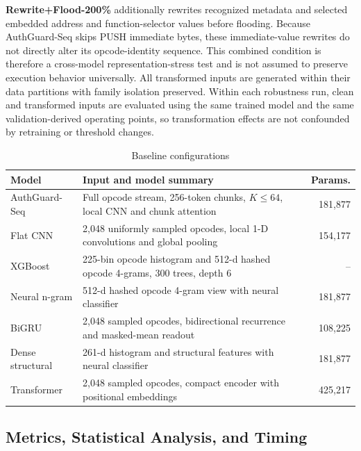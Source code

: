 \documentclass[conference]{IEEEtran}
\begin{document}
\textbf{Rewrite+Flood-200\%} additionally rewrites recognized metadata and selected embedded address and function-selector values before flooding. Because AuthGuard-Seq skips PUSH immediate bytes, these immediate-value rewrites do not directly alter its opcode-identity sequence. This combined condition is therefore a cross-model representation-stress test and is not assumed to preserve execution behavior universally. All transformed inputs are generated within their data partitions with family isolation preserved. Within each robustness run, clean and transformed inputs are evaluated using the same trained model and the same validation-derived operating points, so transformation effects are not confounded by retraining or threshold changes.


\begin{table}[t]
\centering
\caption{Baseline configurations}
\label{tab:baseline-config}
\scriptsize
\begin{tabularx}{\columnwidth}{@{}l X r@{}}
\toprule
Model & Input and model summary & Params. \\
\midrule
AuthGuard-Seq & Full opcode stream, 256-token chunks, $K\leq64$, local CNN and chunk attention & 181,877 \\
Flat CNN & 2,048 uniformly sampled opcodes, local 1-D convolutions and global pooling & 154,177 \\
XGBoost & 225-bin opcode histogram and 512-d hashed opcode 4-grams, 300 trees, depth 6 & -- \\
Neural n-gram & 512-d hashed opcode 4-gram view with neural classifier & 181,877 \\
BiGRU & 2,048 sampled opcodes, bidirectional recurrence and masked-mean readout & 108,225 \\
Dense structural & 261-d histogram and structural features with neural classifier & 181,877 \\
Transformer & 2,048 sampled opcodes, compact encoder with positional embeddings & 425,217 \\
\bottomrule
\end{tabularx}
\end{table}




\subsection{Metrics, Statistical Analysis, and Timing}
\end{document}
